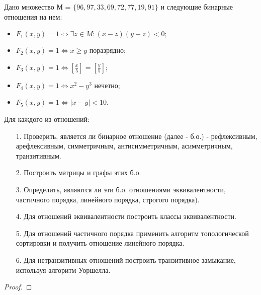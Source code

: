 
\renewcommand*{\proofname}{Решение}
\begin{problem}
	Дано множество М = $\{96, 97, 33, 69, 72, 77, 19, 91\}$
    и следующие бинарные отношения на нем:
    \begin{itemize}
    
    \item $F_1(x,y) = 1 \Leftrightarrow \exists z \in M : (x - z)(y - z) < 0;$

    \item $F_2(x, y) = 1 \Leftrightarrow x \geq y$ поразрядно;

    \item $F_3(x, y) = 1 \Leftrightarrow [\frac{x}{5}] = [\frac{y}{5}]$;

    \item $F_4(x,y) = 1 \Leftrightarrow x^2 - y^3$ нечетно;

    \item $F_5(x, y) = 1 \Leftrightarrow |x-y| < 10$.
    \end{itemize}
    Для каждого из отношений:

    \begin{enumerate}

    \item[1.] Проверить, является ли бинарное отношение (далее -  б.о.) - рефлексивным, арефлексивным, симметричным, антисимметричным, асимметричным, транзитивным.
    \item[2.] Построить матрицы и графы этих б.о.

    \item[3.] Определить, являются ли эти б.о. отношениями эквивалентности, частичного порядка, линейного порядка, строгого порядка).

    \item[4.] Для отношений эквивалентности построить классы эквивалентности.

    \item[5.] Для отношений частичного порядка применить алгоритм топологической сортировки и получить отношение линейного порядка.

    \item[6.] Для нетранзитивных отношений построить транзитивное замыкание, используя алгоритм Уоршелла.
    \end{enumerate}
\end{problem}

\begin{proof}

\end{proof}
